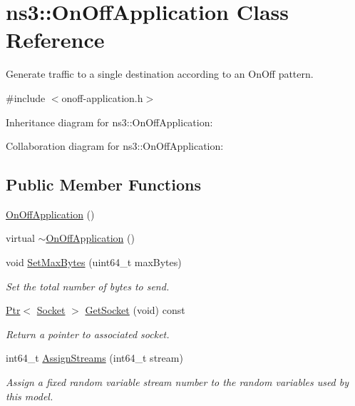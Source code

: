\hypertarget{classns3_1_1OnOffApplication}{}\section{ns3\+:\+:On\+Off\+Application Class Reference}
\label{classns3_1_1OnOffApplication}


Generate traffic to a single destination according to an On\+Off pattern.  




{\ttfamily \#include $<$onoff-\/application.\+h$>$}



Inheritance diagram for ns3\+:\+:On\+Off\+Application\+:


Collaboration diagram for ns3\+:\+:On\+Off\+Application\+:
\subsection*{Public Member Functions}
\begin{DoxyCompactItemize}
\item 
\hyperlink{classns3_1_1OnOffApplication_a9f198293aa71120515c19a0776af46d9}{On\+Off\+Application} ()
\item 
virtual \hyperlink{classns3_1_1OnOffApplication_a255906301f891d6fe63924559af97bcd}{$\sim$\+On\+Off\+Application} ()
\item 
void \hyperlink{classns3_1_1OnOffApplication_a32eaeffa4ab115ff3425f6191818161c}{Set\+Max\+Bytes} (uint64\+\_\+t max\+Bytes)
\begin{DoxyCompactList}\small\item\em Set the total number of bytes to send. \end{DoxyCompactList}\item 
\hyperlink{classns3_1_1Ptr}{Ptr}$<$ \hyperlink{classns3_1_1Socket}{Socket} $>$ \hyperlink{classns3_1_1OnOffApplication_ad4722fe427bf96d33ab7f385463ca20e}{Get\+Socket} (void) const 
\begin{DoxyCompactList}\small\item\em Return a pointer to associated socket. \end{DoxyCompactList}\item 
int64\+\_\+t \hyperlink{classns3_1_1OnOffApplication_acf037609b0b06be3ee401b2e7938c872}{Assign\+Streams} (int64\+\_\+t stream)
\begin{DoxyCompactList}\small\item\em Assign a fixed random variable stream number to the random variables used by this model. \end{DoxyCompactList}\end{DoxyCompactItemize}

